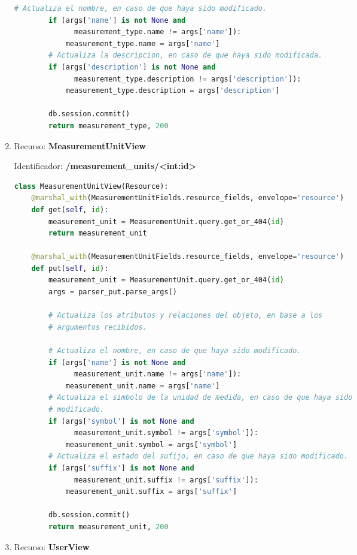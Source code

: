 \documentclass[a4paper,12pt]{article}
\begin{document}
\begin{enumerate}
\begin{lstlisting}[language=Python]
        # Actualiza el nombre, en caso de que haya sido modificado.
        if (args['name'] is not None and
              measurement_type.name != args['name']):
            measurement_type.name = args['name']
        # Actualiza la descripcion, en caso de que haya sido modificada.
        if (args['description'] is not None and
              measurement_type.description != args['description']):
            measurement_type.description = args['description']

        db.session.commit()
        return measurement_type, 200
\end{lstlisting}

\item Recurso: \textbf{MeasurementUnitView}

Identificador: \textbf{/measurement\_units/<int:id>}

\begin{lstlisting}[language=Python]
class MeasurementUnitView(Resource):
    @marshal_with(MeasurementUnitFields.resource_fields, envelope='resource')
    def get(self, id):
        measurement_unit = MeasurementUnit.query.get_or_404(id)
        return measurement_unit

    @marshal_with(MeasurementUnitFields.resource_fields, envelope='resource')
    def put(self, id):
        measurement_unit = MeasurementUnit.query.get_or_404(id)
        args = parser_put.parse_args()

        # Actualiza los atributos y relaciones del objeto, en base a los
        # argumentos recibidos.

        # Actualiza el nombre, en caso de que haya sido modificado.
        if (args['name'] is not None and
              measurement_unit.name != args['name']):
            measurement_unit.name = args['name']
        # Actualiza el simbolo de la unidad de medida, en caso de que haya sido
        # modificado.
        if (args['symbol'] is not None and
              measurement_unit.symbol != args['symbol']):
            measurement_unit.symbol = args['symbol']
        # Actualiza el estado del sufijo, en caso de que haya sido modificado.
        if (args['suffix'] is not None and
              measurement_unit.suffix != args['suffix']):
            measurement_unit.suffix = args['suffix']

        db.session.commit()
        return measurement_unit, 200
\end{lstlisting}

\item Recurso: \textbf{UserView}


\end{enumerate}
\end{document}
